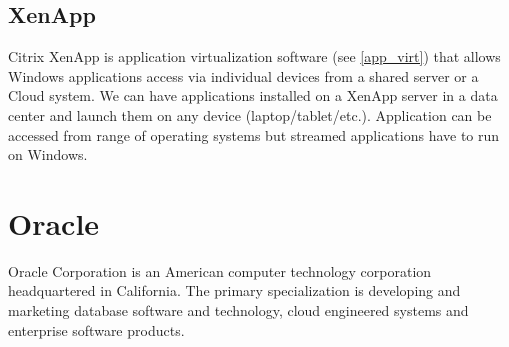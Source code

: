 \subsection{XenApp}
Citrix XenApp is application virtualization software (see \ref{app_virt}) that allows Windows applications access via individual devices from a shared server or a Cloud system. We can have applications installed on a XenApp server in a data center and launch them on any device (laptop/tablet/etc.). Application can be accessed from range of operating systems but streamed applications have to run on Windows.


\section{Oracle \cite{oracle}}
Oracle Corporation is an American computer technology corporation headquartered in California. The primary specialization is developing and marketing database software and technology, cloud engineered systems and enterprise software products.

